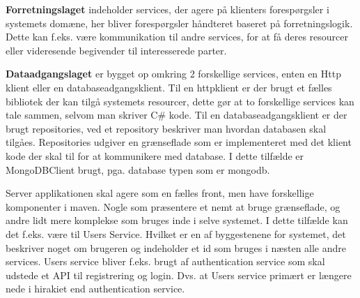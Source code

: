 \textbf{Forretningslaget} indeholder services, der agere på klienters forespørgsler i systemets domæne, her bliver forespørgsler håndteret baseret på forretningslogik. Dette kan f.eks. være kommunikation til andre services, for at få deres resourcer eller videresende begivender til interesserede parter. 

\textbf{Dataadgangslaget} er bygget op omkring 2 forskellige services, enten en Http klient eller en databaseadgangsklient. Til en httpklient er der brugt et fælles bibliotek der kan tilgå systemets resourcer, dette gør at to forskellige services kan tale sammen, selvom man skriver C# kode. Til en databaseadgangsklient er der brugt repositories, ved et repository beskriver man hvordan databasen skal tilgåes. Repositories udgiver en grænseflade som er implementeret med det klient kode der skal til for at kommunikere med database. I dette tilfælde er MongoDBClient brugt, pga. database typen som er mongodb.

Server applikationen skal agere som en fælles front, men have forskellige komponenter i maven. Nogle som præsentere et nemt at bruge grænseflade, og andre lidt mere komplekse som bruges inde i selve systemet. I dette tilfælde kan det f.eks. være til Users Service. Hvilket er en af byggestenene for systemet, det beskriver noget om brugeren og indeholder et id som bruges i næsten alle andre services. Users service bliver f.eks. brugt af authentication service som skal udstede et API til registrering og login. Dvs. at Users service primært er længere nede i hirakiet end authentication service.
